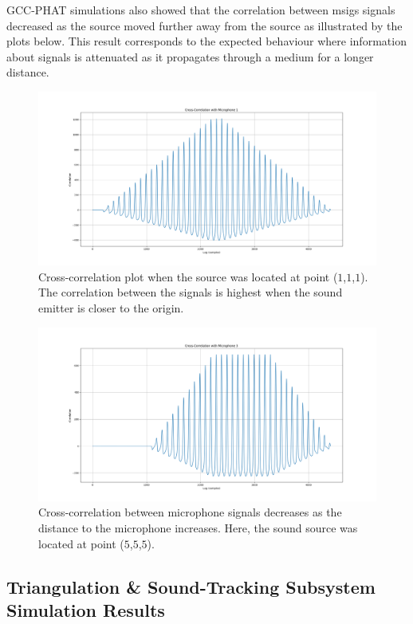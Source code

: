 \documentclass[a4paper,11pt]{article}
\begin{document}
GCC-PHAT simulations also showed that the correlation between \gls{msigs} signals decreased as the source moved further away from the source as illustrated by the plots below. This result corresponds to the expected behaviour where information about signals is attenuated as it propagates through a medium for a longer distance.
\begin{figure}[ht!]
	\centering
	\includegraphics[width=1.0\linewidth]{correlation_1.png}
	\caption{Cross-correlation plot when the source was located at point ($1$,$1$,$1$). The correlation between the signals is highest when the sound emitter is closer to the origin.}
	\label{fig:cross-1}
\end{figure}

\begin{figure}[ht!]
	\centering
	\includegraphics[width=1.0\linewidth]{correlation_5.png}
	\caption{Cross-correlation between microphone signals decreases as the distance to the microphone increases. Here, the sound source was located at point ($5$,$5$,$5$).}
	\label{fig:cross-3}
\end{figure}

\subsection{Triangulation \& Sound-Tracking Subsystem Simulation Results}
\end{document}
